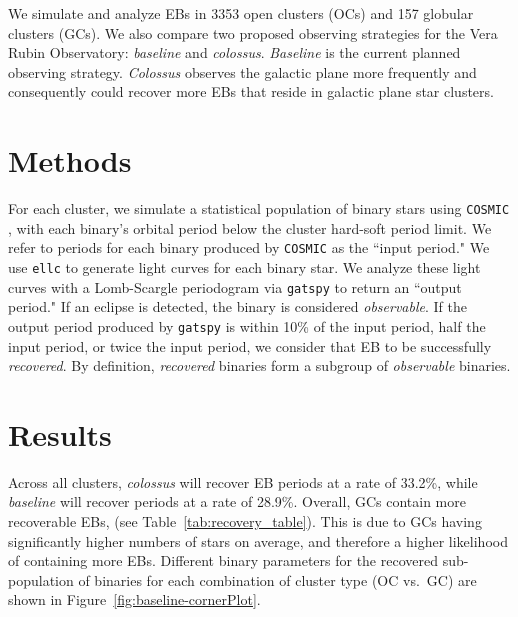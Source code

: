 \documentclass[RNAAS]{aastex63}
\begin{document}
We simulate and analyze EBs in 3353 open clusters (OCs) and 157 globular clusters (GCs). We also compare two proposed observing strategies for the Vera Rubin Observatory: \textit{baseline} and \textit{colossus}. \textit{Baseline} is the current planned observing strategy. \textit{Colossus} observes the galactic plane more frequently and consequently could recover more EBs that reside in galactic plane star clusters.

\section{Methods}
\label{sec:Methods}
For each cluster, we simulate a statistical population of binary stars using \texttt{COSMIC} \citep{2018ApJ...854L...1B}, with each binary's orbital period below the cluster hard-soft period limit. We refer to periods for each binary produced by \texttt{COSMIC} as the ``input period." We use \texttt{ellc} \citep{2016ascl.soft03016M} to generate light curves for each binary star. We analyze these light curves with a Lomb-Scargle periodogram via \texttt{gatspy} \citep{2017PASP..129f5003W} to return an ``output period." If an eclipse is detected, the binary is considered \textit{observable}. If the output period produced by \texttt{gatspy} is within 10\% of the input period, half the input period, or twice the input period, we consider that EB to be successfully \textit{recovered}. By definition, \textit{recovered} binaries form a subgroup of \textit{observable} binaries.

\section{Results}
\label{sec:Results}
Across all clusters, \textit{colossus} will recover EB periods at a rate of 33.2\%, while \textit{baseline} will recover periods at a rate of 28.9\%. Overall, GCs contain more recoverable EBs, (see Table~\ref{tab:recovery_table}). This is due to GCs having significantly higher numbers of stars on average, and therefore a higher likelihood of containing more EBs. Different binary parameters for the recovered sub-population of binaries for each combination of cluster type (OC vs.\ GC) are shown in Figure~\ref{fig:baseline-cornerPlot}.
\end{document}
